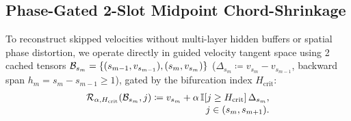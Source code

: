 \subsection{Phase-Gated 2-Slot Midpoint Chord-Shrinkage}
\label{sec:shrinkage}

To reconstruct skipped velocities without multi-layer hidden buffers or spatial phase distortion, we operate directly in guided velocity tangent space using 2 cached tensors $\mathcal{B}_{s_m} = \{(s_{m-1}, v_{s_{m-1}}), (s_m, v_{s_m})\}$ ($\Delta_{s_m} \coloneqq v_{s_m} - v_{s_{m-1}}$, backward span $h_m = s_m - s_{m-1} \ge 1$), gated by the bifurcation index $H_{\mathrm{crit}}$:
\begin{equation}
\begin{aligned}
\mathcal{R}_{\alpha, H_{\mathrm{crit}}}(\mathcal{B}_{s_m}, j) \coloneqq v_{s_m} + \alpha\,\mathbb{I}[j \ge H_{\mathrm{crit}}]\,\Delta_{s_m}, \\[-2pt]
j \in (s_m, s_{m+1}).
\end{aligned}
\label{eq:midpoint_op}
\end{equation}

